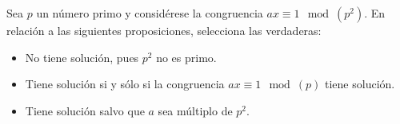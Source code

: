 \begin{ejercicio}
    Sea $p$ un número primo y considérese la congruencia $ax\equiv 1\mod (p^2)$. En relación a las siguientes proposiciones, selecciona las verdaderas:
    \begin{itemize}
        \item No tiene solución, pues $p^2$ no es primo.
        \item Tiene solución si y sólo si la congruencia $ax\equiv 1\mod (p)$ tiene solución.
        \item Tiene solución salvo que $a$ sea múltiplo de $p^2$.
    \end{itemize}
\end{ejercicio}

\newpage
\ %
\resetearcontador

